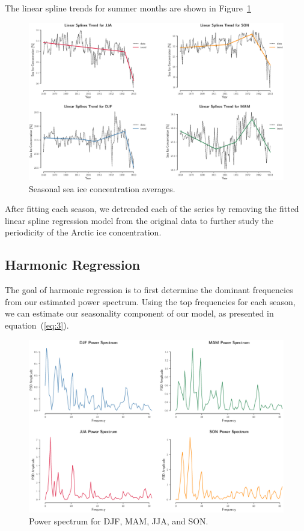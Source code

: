 \documentclass[12pt]{article}
\begin{document}
The linear spline trends for summer months are shown in Figure~\ref{trends}

\begin{figure}[!htbp]
  \includegraphics[width=1\textwidth,center]{figs/trends}
  \caption{Seasonal sea ice concentration averages.}\label{trends}
\end{figure}

After fitting each season, we detrended each of the series by removing the fitted linear spline regression model from the original data to further study the periodicity of the Arctic ice concentration.

\subsection{Harmonic Regression}
The goal of harmonic regression is to first determine the dominant frequencies from our estimated power spectrum. Using the top frequencies for each season, we can estimate our seasonality component of our model, as presented in equation~(\ref{eq:3}).

\begin{figure}[!htbp]
  \centering
  \includegraphics[width=1\textwidth,center]{figs/psd}
  \caption{Power spectrum for DJF, MAM, JJA, and SON.}\label{psd}
\end{figure}
\end{document}
